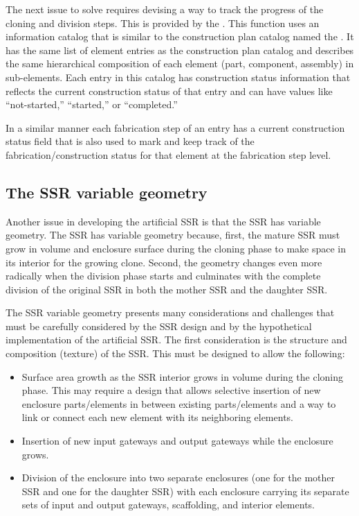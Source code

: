 The next issue to solve requires devising
a way to track the
progress of the cloning and division steps. This is provided by the
. This function uses an
information catalog that is similar to the construction plan catalog named the
. It has 
the same list of element entries as the construction plan
catalog and describes the same hierarchical composition of each element
(part, component, assembly) in sub-elements.  Each entry in this
catalog has construction status information that reflects the current
construction status of that entry and can have values like ``not-started,'' 
``started,'' or ``completed.''

In a similar manner each fabrication step of an entry has a current
construction status field that is also used to mark and keep track of
the fabrication/construction status for that element at the fabrication
step level.

\subsection[The SSR variable geometry]{The SSR variable geometry}

Another issue in developing the artificial SSR is that the SSR has variable
geometry.  The SSR has variable geometry because, first, the mature SSR must 
grow in volume and enclosure surface during the cloning phase to make space 
in its interior for the growing clone. Second, the geometry changes even more 
radically when the division phase
starts and culminates with the complete division of the original SSR in
both the mother SSR and the daughter SSR.

The SSR variable geometry presents many considerations and challenges that must
be carefully considered by the SSR design and by the hypothetical
implementation of the artificial SSR.  
The first consideration is the structure and composition (texture) of the SSR.  This
must be designed to allow the following:
\begin{itemize}
\item Surface area growth as the SSR interior grows in volume during the
cloning phase. This may require a design that allows selective
insertion of new enclosure parts/elements in between existing
parts/elements and a way to link or connect each new
element with its neighboring elements.
\item Insertion of new input gateways and output gateways while the enclosure grows.
\item Division of the enclosure into two separate enclosures (one for
the mother SSR and one for the daughter SSR)  with each enclosure
carrying its separate sets of input and output gateways, 
scaffolding, and interior elements.
\end{itemize}

